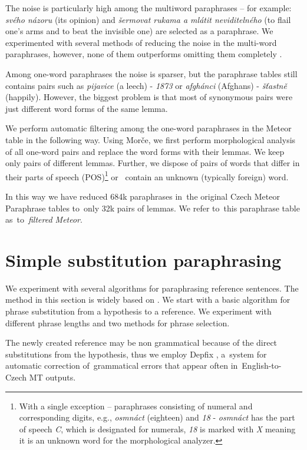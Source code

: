 \documentclass[11pt]{article}
\begin{document}
The noise is particularly high among the multiword paraphrases -- for %
example: \textit{svého názoru} (its opinion) and \textit{šermovat rukama a 
mlátit neviditelného} (to flail one's arms and to beat the invisible one) are 
selected as a paraphrase. We experimented with several methods of reducing
the noise in the multi-word paraphrases, however, none of them outperforms
omitting them completely \cite{barancikova:2014}.
 
Among one-word paraphrases the noise is sparser, but the paraphrase tables  %
still contains pairs such as \textit{pijavice} (a leech) - \textit{1873}
or \textit{afgh\'{a}nci} (Afghans) - \textit{š\v{t}astně} (happily). 
However, the biggest problem is that most of synonymous pairs were just 
different word forms of the same lemma. 

We perform automatic filtering among the one-word paraphrases in the 
Meteor table in the following way. Using Morče, we first perform morphological  %
analysis of all one-word pairs and replace the word forms with their lemmas. We 
keep only pairs of different lemmas. Further, we dispose of pairs of words that 
differ in their parts of speech (POS)\footnote{With a single exception -- 
paraphrases consisting of numeral and corresponding digits, e.g., 
\textit{osmnáct} (eighteen) and \textit{18} - \textit{osmnáct} has the part of 
speech \textit{C}, which is designated for numerals, \textit{18} is marked with 
\textit{X} meaning it is an unknown word for the morphological analyzer.} or
~contain an unknown (typically foreign) word.

In this way we have reduced 684k paraphrases in~the original Czech Meteor 
Paraphrase tables to~only 32k pairs of lemmas. We refer to~this paraphrase
table as~to~\textit{filtered Meteor}.

\section{Simple substitution paraphrasing}
\label{lrec}
We experiment with several algorithms for paraphrasing reference sentences. 
The method in this section is widely based on . We start with 
a basic algorithm for phrase substitution from a hypothesis to a reference. 
We experiment with different phrase lengths and two methods for phrase 
selection.

The newly created reference may be non grammatical because of the direct
substitutions from the hypothesis, thus we employ Depfix \cite{depfix}, 
a~system for automatic correction of~grammatical errors that appear often 
in~English-to-Czech MT outputs. 
\end{document}

